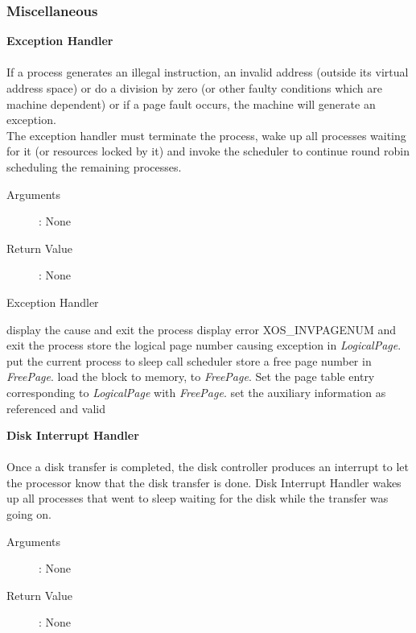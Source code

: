 \documentclass[10pt]{article}
\begin{document}
\subsubsection{Miscellaneous}
\textbf{Exception Handler}
\\ \\
If a process generates an illegal instruction, an invalid address (outside its virtual address space) or do a division by zero (or other faulty conditions which are machine dependent) or if a page fault occurs, the machine will generate an exception. 
\\
The exception handler must terminate the process, wake up all processes waiting for it (or resources locked by it) and invoke the scheduler to continue round robin scheduling the remaining processes.
\begin{description}
\item[Arguments]: None
\item[Return Value]: None
\end{description} 
\begin{algorithm}
\caption{Exception Handler}
\begin{algorithmic}
    \STATE display the cause and exit the process
\ENDIF
{}
    \STATE display error XOS\_INVPAGENUM and exit the process
\ELSE
    \STATE store the logical page number causing exception in \textit{LogicalPage}.
        \STATE put the current process to sleep
        \STATE call scheduler
    \ENDWHILE
    \STATE store a free page number in \textit{FreePage}.
        \STATE load the block to memory, to \textit{FreePage}.
    \ENDIF
    \STATE Set the page table entry corresponding to \textit{LogicalPage} with \textit{FreePage}.
    \STATE set the auxiliary information as referenced and valid
\ENDIF
\RETURN
\end{algorithmic}
\end{algorithm}
\vspace{45mm}
\textbf{Disk Interrupt Handler}
\\ \\
Once a disk transfer is completed, the disk controller produces an interrupt to let the processor know that the disk transfer is done. Disk Interrupt Handler wakes up all processes that went to sleep waiting for the disk while the transfer was going on. 
\begin{description}
\item[Arguments]: None
\item[Return Value]: None
\end{description} 
\end{document}
